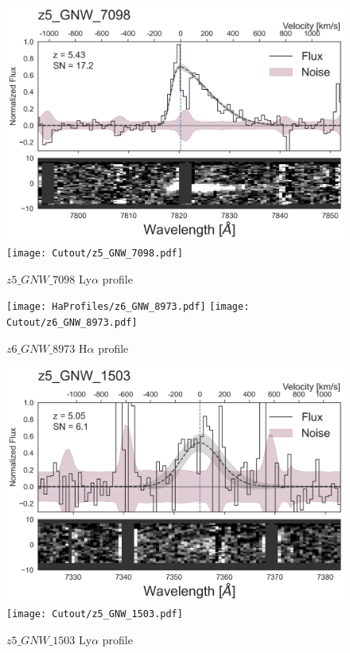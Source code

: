 \documentclass[12pt,english]{article}
\begin{document}
\begin{figure}
\begin{center}\includegraphics[width=12cm, trim=0.1cm 0cm 0cm -1cm]{LyaProfiles/z5_GNW_7098.png}
\texttt{[image: Cutout/z5\_GNW\_7098.pdf]}
\caption{$z5\_GNW\_7098$ Ly$\alpha$ profile}
\end{center}
\end{figure}
\clearpage
\begin{figure}
\begin{center}\texttt{[image: HaProfiles/z6\_GNW\_8973.pdf]}
\texttt{[image: Cutout/z6\_GNW\_8973.pdf]}
\caption{$z6\_GNW\_8973$ H$\alpha$ profile}
\end{center}
\end{figure}
\clearpage
\begin{figure}
\begin{center}\includegraphics[width=12cm, trim=0.1cm 0cm 0cm -1cm]{LyaProfiles/z5_GNW_1503.png}
\texttt{[image: Cutout/z5\_GNW\_1503.pdf]}
\caption{$z5\_GNW\_1503$ Ly$\alpha$ profile}
\end{center}
\end{figure}
\end{document}
